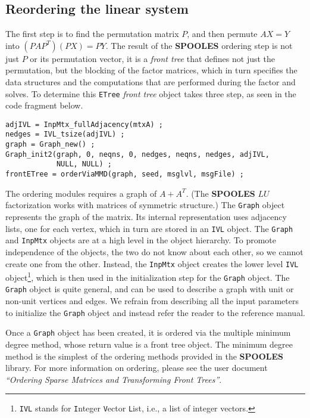 \subsection{Reordering the linear system}
\label{subsection:serial:reordering}
\par
The first step is to find the permutation matrix $P$, and then
permute $AX = Y$ into $(PAP^T)(PX) = PY$.
The result of the {\bf SPOOLES} ordering step is not just $P$ 
or its permutation vector, it is a {\it front tree} that defines
not just the permutation, but the blocking of the factor matrices,
which in turn specifies the data structures and the computations
that are performed during the factor and solves.
To determine this {\tt ETree} {\it front tree} object takes three
step, as seen in the code fragment below.
\begin{verbatim}
adjIVL = InpMtx_fullAdjacency(mtxA) ;
nedges = IVL_tsize(adjIVL) ;
graph = Graph_new() ;
Graph_init2(graph, 0, neqns, 0, nedges, neqns, nedges, adjIVL,
            NULL, NULL) ;
frontETree = orderViaMMD(graph, seed, msglvl, msgFile) ;
\end{verbatim}
The ordering modules requires a graph of $A + A^T$.
(The {\bf SPOOLES} $LU$ factorization works with matrices of
symmetric structure.)
The {\tt Graph} object represents the graph of the matrix.
Its internal representation uses adjacency lists, one for each
vertex, which in turn are stored in an {\tt IVL} object.
The {\tt Graph} and {\tt InpMtx} objects are at a high level 
in the object hierarchy.
To promote independence of the objects, the two do not know about
each other, so we cannot create one from the other.
Instead, the {\tt InpMtx} object creates the lower level {\tt IVL}
object\footnote{{\tt IVL} stands for {\tt I}nteger {\tt V}ector
{\tt L}ist, i.e., a list of integer vectors.}, which is then used
in the initialization step for the {\tt Graph} object.
The {\tt Graph} object is quite general, and can be used to
describe a graph with unit or non-unit vertices and edges.
We refrain from describing all the input parameters to initialize
the {\tt Graph} object and instead refer the reader to the
reference manual.
\par
Once a {\tt Graph} object has been created, it is ordered via the
multiple minimum degree method, whose return value is a front tree
object.
The minimum degree method is the simplest of the ordering methods
provided in the {\bf SPOOLES} library.
For more information on ordering, please see the user document
{\it ``Ordering Sparse Matrices and Transforming Front Trees''}.
\par
